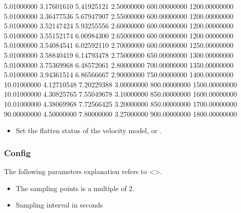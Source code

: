 \documentclass[a4paper,10pt,english,openany]{sphinxmanual}
\begin{document}
\begin{sphinxVerbatim}[commandchars=\\\{\},numbers=left,firstnumber=1,stepnumber=1]
5.01000000   3.17601610   5.41925121   2.50000000   600.00000000   1200.00000000   
5.01000000   3.36477536   5.67947907   2.55000000   600.00000000   1200.00000000   
5.01000000   3.52147424   5.93255556   2.60000000   600.00000000   1200.00000000   
5.01000000   3.55152174   6.00984300   2.65000000   600.00000000   1200.00000000   
5.01000000   3.54084541   6.02592110   2.70000000   600.00000000   1250.00000000   
5.01000000   3.58840419   6.14793478   2.75000000   650.00000000   1300.00000000   
5.01000000   3.75369968   6.48572061   2.80000000   700.00000000   1350.00000000   
5.01000000   3.94361514   6.86566667   2.90000000   750.00000000   1400.00000000   
10.01000000   4.12710548   7.20229388   3.00000000   800.00000000   1500.00000000   
10.01000000   4.30825765   7.55049678   3.10000000   850.00000000   1600.00000000   
10.01000000   4.38069968   7.72566425   3.20000000   850.00000000   1700.00000000   
90.00000000   4.50000000   7.80000000   3.27000000   900.00000000   1800.00000000   
\end{sphinxVerbatim}

\begin{itemize}
\item {} 
Set the flatten status of the velocity model,  or .

\end{itemize}


\subsubsection{Config}
\label{\detokenize{tutorials/S1_Build_GFs:config}}
The following parameters explanation refers to  <>.

\begin{itemize}
\item {} 
The sampling points is a multiple of 2.

\end{itemize}

\begin{itemize}
\item {} 
Sampling interval in seconds

\end{itemize}
\end{document}
